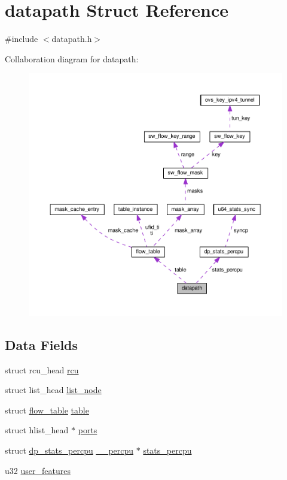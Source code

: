 \hypertarget{structdatapath}{}\section{datapath Struct Reference}
\label{structdatapath}


{\ttfamily \#include $<$datapath.\+h$>$}



Collaboration diagram for datapath\+:
\nopagebreak
\begin{figure}[H]
\begin{center}
\leavevmode
\includegraphics[width=350pt]{structdatapath__coll__graph}
\end{center}
\end{figure}
\subsection*{Data Fields}
\begin{DoxyCompactItemize}
\item 
struct rcu\+\_\+head \hyperlink{structdatapath_af487ac38fa868c398dd248f1956b7a35}{rcu}
\item 
struct list\+\_\+head \hyperlink{structdatapath_ac5f44be07025a2addb5c393fba822000}{list\+\_\+node}
\item 
struct \hyperlink{structflow__table}{flow\+\_\+table} \hyperlink{structdatapath_ac6d67fe586c19484391acbcfa267259d}{table}
\item 
struct hlist\+\_\+head $\ast$ \hyperlink{structdatapath_abb0de528545b312de283b571cb6c4ede}{ports}
\item 
struct \hyperlink{structdp__stats__percpu}{dp\+\_\+stats\+\_\+percpu} \hyperlink{compiler_8h_a497f20279760cdb59a5187689f9f5ab1}{\+\_\+\+\_\+percpu} $\ast$ \hyperlink{structdatapath_a26ff295c711206c8177cdc89150c6a4a}{stats\+\_\+percpu}
\item 
u32 \hyperlink{structdatapath_a92ce3b704c20f18b3a696f98b6f7d266}{user\+\_\+features}
\end{DoxyCompactItemize}


